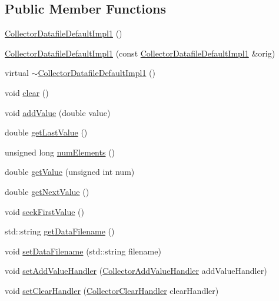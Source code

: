 \subsection*{Public Member Functions}
\begin{DoxyCompactItemize}
\item 
\hyperlink{class_collector_datafile_default_impl1_a4bbd717c648b3d5f87a19b01698d87c4}{Collector\+Datafile\+Default\+Impl1} ()
\item 
\hyperlink{class_collector_datafile_default_impl1_a7632b6ce3ad9d28fe2c731a7455ff40d}{Collector\+Datafile\+Default\+Impl1} (const \hyperlink{class_collector_datafile_default_impl1}{Collector\+Datafile\+Default\+Impl1} \&orig)
\item 
virtual \hyperlink{class_collector_datafile_default_impl1_a774b493b35d3fbde63e5b6458b03c772}{$\sim$\+Collector\+Datafile\+Default\+Impl1} ()
\item 
void \hyperlink{class_collector_datafile_default_impl1_aa84fa9593fd46ff37e91147aa43f71c9}{clear} ()
\item 
void \hyperlink{class_collector_datafile_default_impl1_a79de52a90a2c428ca59812f046b34ae4}{add\+Value} (double value)
\item 
double \hyperlink{class_collector_datafile_default_impl1_a453988253db1796199b41c28162c8009}{get\+Last\+Value} ()
\item 
unsigned long \hyperlink{class_collector_datafile_default_impl1_a485e0be4646bbde54578b145f3735983}{num\+Elements} ()
\item 
double \hyperlink{class_collector_datafile_default_impl1_ac40e05b78e9fcc41c648664a9597d30c}{get\+Value} (unsigned int num)
\item 
double \hyperlink{class_collector_datafile_default_impl1_a615090f649ddd8260b1f058f6cd29668}{get\+Next\+Value} ()
\item 
void \hyperlink{class_collector_datafile_default_impl1_ad8ddefdc93c51945922ea73af95def05}{seek\+First\+Value} ()
\item 
std\+::string \hyperlink{class_collector_datafile_default_impl1_afe570b0792bf13a06ff1dea12d7593b7}{get\+Data\+Filename} ()
\item 
void \hyperlink{class_collector_datafile_default_impl1_a62352f75a7635654108bb2b8b9604e1d}{set\+Data\+Filename} (std\+::string filename)
\item 
void \hyperlink{class_collector_datafile_default_impl1_adad90926a028e08397aaafa05ae643c6}{set\+Add\+Value\+Handler} (\hyperlink{_collector__if_8h_ab97c9a368c50eb9e00cb4772e46ff38a}{Collector\+Add\+Value\+Handler} add\+Value\+Handler)
\item 
void \hyperlink{class_collector_datafile_default_impl1_ae4aae3cbd96ebec268c931bd7a0a57a5}{set\+Clear\+Handler} (\hyperlink{_collector__if_8h_ad22205bb584ed3e0db55fc265a5fe1f4}{Collector\+Clear\+Handler} clear\+Handler)
\end{DoxyCompactItemize}


